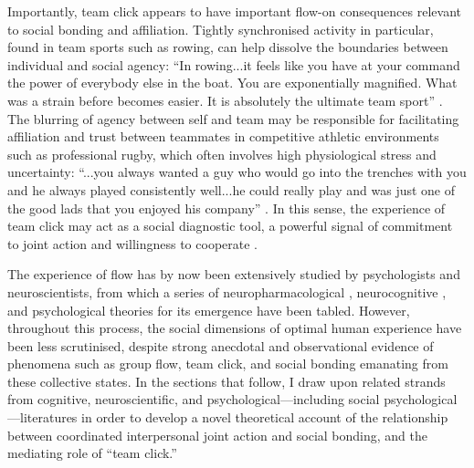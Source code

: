 Importantly, team click appears to have important flow-on consequences relevant to social bonding and affiliation. Tightly synchronised activity in particular, found in team sports such as rowing, can help dissolve the boundaries between individual and social agency: ``In rowing...it feels like you have at your command the power of everybody else in the boat. You are exponentially magnified. What was a strain before becomes easier. It is absolutely the ultimate team sport'' \citep{Brown2016}.
The blurring of agency between self and team may be responsible for facilitating affiliation and trust between teammates in competitive athletic environments such as professional rugby, which often involves high physiological stress and uncertainty: ``...you always wanted a guy who would go into the trenches with you and he always played consistently well...he could really play and was just one of the good lads that you enjoyed his company'' \citep{Fox-Sports2017}. In this sense, the experience of team click may act as a social diagnostic tool, a powerful signal of commitment to joint action and willingness to cooperate \citep{Reddish2013a}.

The experience of flow has by now been extensively studied by psychologists and neuroscientists, from which a series of neuropharmacological \citep{Boecker2008}, neurocognitive \citep{Dietrich2006,Dietrich2011,Labelle2013}, and psychological \citep{Csikszentmihalyi1992} theories for its emergence have been tabled.  However, throughout this process, the social dimensions of optimal human experience have been less scrutinised, despite strong anecdotal and observational evidence of phenomena such as group flow, team click, and social bonding emanating from these collective states. In the sections that follow, I draw upon related strands from cognitive, neuroscientific, and psychological---including social psychological---literatures in order to develop a novel theoretical account of the relationship between coordinated interpersonal joint action and social bonding, and the mediating role of ``team click.''





\clearpage
